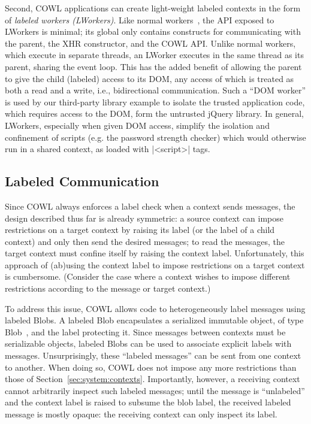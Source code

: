 Second, COWL applications can create light-weight labeled contexts
in the form of \emph{labeled workers (LWorkers)}.
%
Like normal workers~\cite{workers}, the API exposed to LWorkers is
minimal; its global only contains constructs for communicating
with the parent, the XHR constructor, and the COWL API.
%
Unlike normal workers, which execute in separate threads, an LWorker
executes in the same thread as its parent, sharing the event loop.
%
This has the added benefit of allowing the parent to give the child
(labeled) access to its DOM, any access of which is treated as both a
read and a write, i.e., bidirectional communication.
%
Such a ``DOM worker'' is used by our third-party library example to
isolate the trusted application code, which requires access to the
DOM, form the untrusted jQuery library.
%
In general, LWorkers, especially when given DOM access, simplify the
isolation and confinement of scripts (e.g. the password strength
checker) which would otherwise run in a shared context, as loaded with
\js|<script>| tags.


\subsection{Labeled Communication}
\label{sec:system:communication}
Since COWL always enforces a label check when a context sends
messages, the design described thus far is already symmetric: a source
context can impose restrictions on a target context by raising its
label (or the label of a child context) and only then send the desired
messages; to read the messages, the target context must confine itself
by raising the context label.
%
Unfortunately, this approach of (ab)using the context label to impose
restrictions on a target context is cumbersome.
%
(Consider the case where a context wishes to impose different
restrictions according to the message or target context.)

To address this issue, COWL allows code to heterogeneously label
messages using labeled Blobs.
%
A labeled Blob encapsulates a serialized immutable object, of type
Blob~\cite{html5}, and the label protecting it.
%
Since messages between contexts must be serializable objects, labeled
Blobs can be used to associate explicit labels with messages.
%
Unsurprisingly, these ``labeled messages'' can be sent from one
context to another.
%
When doing so, COWL does not impose any more restrictions than those of
Section~\ref{sec:system:contexts}.
%
Importantly, however, a receiving context cannot arbitrarily inspect
such labeled messages;
%
until the message is ``unlabeled'' and the context label is raised to
subsume the blob label, the received labeled message is mostly opaque:
the receiving context can only inspect its label.

